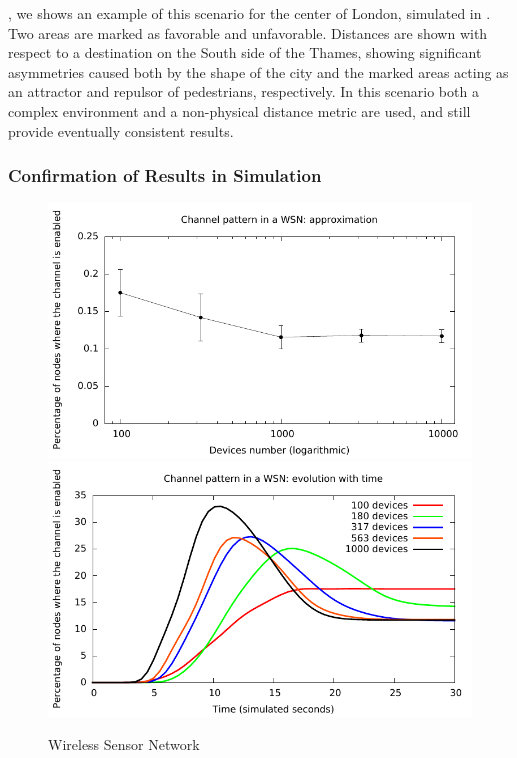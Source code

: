\documentclass[12pt,a4paper,twoside,openright]{book}
\begin{document}
, we shows an example of this scenario for the center of London, simulated in \alchemist{}.
%
Two areas are marked as favorable and unfavorable.
%
Distances are shown with respect to a destination on the South side of the Thames, showing significant asymmetries caused both by the shape of the city and the marked areas acting as an attractor and repulsor of pedestrians, respectively.
%
In this scenario both a complex environment and a non-physical distance metric are used, and still provide eventually consistent results.

\subsubsection{Confirmation of Results in Simulation}

\begin{figure}
	\centering
	\includegraphics[width=\textwidth]{img/tetc-graphs/wsn-approx-nosmooth}
	\includegraphics[width=\textwidth]{img/tetc-graphs/wsn-time}
	\caption{Wireless Sensor Network}
	\label{f:tests-wsn}
\end{figure}
\end{document}
